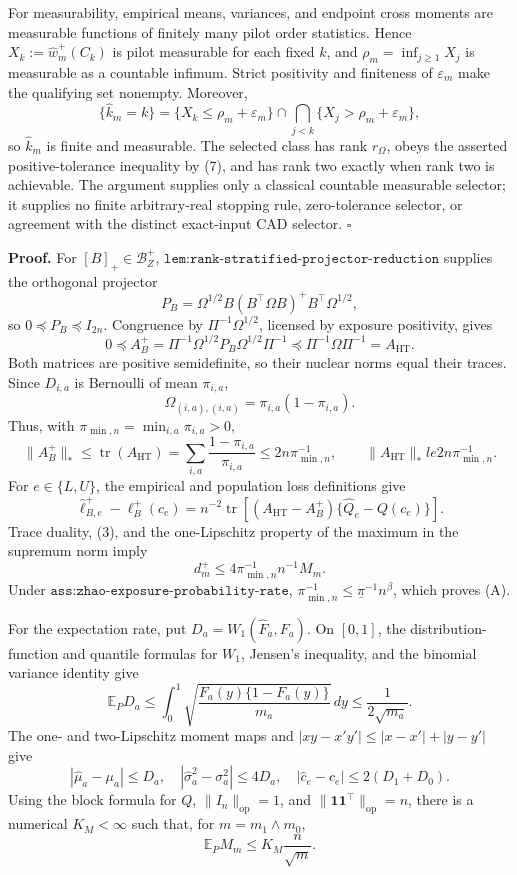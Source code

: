 For measurability, empirical means, variances, and endpoint cross moments are measurable functions of finitely many pilot order statistics.  Hence \(X_k:=\widehat w_m^+(C_k)\) is pilot measurable for each fixed \(k\), and \(\rho_m=\inf_{j\ge1}X_j\) is measurable as a countable infimum.  Strict positivity and finiteness of \(\varepsilon_m\) make the qualifying set nonempty.  Moreover,
\[
\{\widehat k_m=k\}
=\{X_k\le\rho_m+\varepsilon_m\}
\cap\bigcap_{j<k}\{X_j>\rho_m+\varepsilon_m\},
\tag{8}
\]
so \(\widehat k_m\) is finite and measurable.  The selected class has rank \(r_\Omega\), obeys the asserted positive-tolerance inequality by (7), and has rank two exactly when rank two is achievable.  The argument supplies only a classical countable measurable selector; it supplies no finite arbitrary-real stopping rule, zero-tolerance selector, or agreement with the distinct exact-input CAD selector. \(\square\)

\textbf{Proof.}
For \([B]_+\in\mathcal B_Z^+\), \(\texttt{lem:rank-stratified-projector-reduction}\) supplies the orthogonal projector
\[
P_B=\Omega^{1/2}B(B^{\top}\Omega B)^+B^{\top}\Omega^{1/2},
\]
so \(0\preceq P_B\preceq I_{2n}\).  Congruence by \(\Pi^{-1}\Omega^{1/2}\), licensed by exposure positivity, gives
\[
0\preceq A_B^+
=\Pi^{-1}\Omega^{1/2}P_B\Omega^{1/2}\Pi^{-1}
\preceq \Pi^{-1}\Omega\Pi^{-1}=A_{\mathrm{HT}}.
\tag{1}
\]
Both matrices are positive semidefinite, so their nuclear norms equal their traces.  Since \(D_{i,a}\) is Bernoulli of mean \(\pi_{i,a}\),
\[
\Omega_{(i,a),(i,a)}=\pi_{i,a}(1-\pi_{i,a}).
\tag{2}
\]
Thus, with \(\pi_{\min,n}=\min_{i,a}\pi_{i,a}>0\),
\[
\lVert A_B^+\rVert_*
\le\operatorname{tr}(A_{\mathrm{HT}})
=\sum_{i,a}\frac{1-\pi_{i,a}}{\pi_{i,a}}
\le2n\pi_{\min,n}^{-1},
\qquad
\lVert A_{\mathrm{HT}}\rVert_*le2n\pi_{\min,n}^{-1}.
\tag{3}
\]
For \(e\in\{L,U\}\), the empirical and population loss definitions give
\[
\widehat\ell_{B,e}^+-\ell_B^+(c_e)
=n^{-2}\operatorname{tr}\!\left[(A_{\mathrm{HT}}-A_B^+)
\{\widehat Q_e-Q(c_e)\}\right].
\tag{4}
\]
Trace duality, (3), and the one-Lipschitz property of the maximum in the supremum norm imply
\[
d_m^+\le4\pi_{\min,n}^{-1}n^{-1}M_m.
\tag{5}
\]
Under \(\texttt{ass:zhao-exposure-probability-rate}\), \(\pi_{\min,n}^{-1}\le\underline\pi^{-1}n^\beta\), which proves (A).

For the expectation rate, put \(D_a=W_1(\widehat F_a,F_a)\).  On \([0,1]\), the distribution-function and quantile formulas for \(W_1\), Jensen's inequality, and the binomial variance identity give
\[
\mathbb E_PD_a
\le\int_0^1\sqrt{\frac{F_a(y)\{1-F_a(y)\}}{m_a}}\,dy
\le\frac1{2\sqrt{m_a}}.
\tag{6}
\]
The one- and two-Lipschitz moment maps and
\(|xy-x'y'|\le|x-x'|+|y-y'|\) give
\[
|\widehat\mu_a-\mu_a|\le D_a,
\quad |\widehat\sigma_a^2-\sigma_a^2|\le4D_a,
\quad |\widehat c_e-c_e|\le2(D_1+D_0).
\tag{7}
\]
Using the block formula for \(Q\), \(\lVert I_n\rVert_{\mathrm{op}}=1\), and \(\lVert\mathbf1\mathbf1^{\top}\rVert_{\mathrm{op}}=n\), there is a numerical \(K_M<\infty\) such that, for \(m=m_1\wedge m_0\),
\[
\mathbb E_PM_m\le K_M\frac n{\sqrt m}.
\tag{8}
\]

